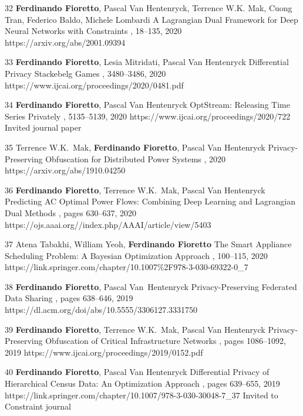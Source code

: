 \documentclass[localFont,alternative]{documentMETADATA}
\begin{document}
\begin{pubs}
	\confentryShort
	{32} %
	{{\bf Ferdinando Fioretto}, Pascal Van Hentenryck, Terrence W.K. Mak, {Cuong Tran}, Federico Baldo, Michele Lombardi} 
	{A Lagrangian Dual Framework for Deep Neural Networks with Constraints}
	{\procECML, 18--135, 2020}
	{https://arxiv.org/abs/2001.09394}

	\confentryShort
		{33} %
		{{\bf Ferdinando Fioretto}, Lesia Mitridati, Pascal Van Hentenryck}
		{Differential Privacy Stackebelg Games}
		{\procIJCAI, 3480--3486, 2020}
		{https://www.ijcai.org/proceedings/2020/0481.pdf}

	\confentryShortAwd
		{34} %
		{{\bf Ferdinando Fioretto}, Pascal Van Hentenryck}
		{OptStream: Releasing Time Series Privately}
		{\procIJCAI, 5135--5139, 2020}
	  {https://www.ijcai.org/proceedings/2020/722}
	  {Invited journal paper}
	
	\confentryShort
		{35} %
		{Terrence W.K.~Mak, {\bf Ferdinando Fioretto}, Pascal Van Hentenryck}
		{Privacy-Preserving Obfuscation for Distributed Power Systems}
		{\procPSCC, 2020}
		{https://arxiv.org/abs/1910.04250}

	\confentryShort
		{36} %
		{{\bf Ferdinando Fioretto}, Terrence W.K.~Mak, Pascal Van Hentenryck}
		{Predicting AC Optimal Power Flows: Combining Deep Learning and Lagrangian Dual Methods}
	  	{\procAAAI, pages 630--637, 2020}
	  	{https://ojs.aaai.org//index.php/AAAI/article/view/5403}

	\confentryShort
		{37} %
	    {Atena Tabakhi, William Yeoh, {\bf Ferdinando Fioretto}}
	    {The Smart Appliance Scheduling Problem: A Bayesian Optimization Approach}
	    {\procPRIMA, 100--115, 2020}
	    {https://link.springer.com/chapter/10.1007\%2F978-3-030-69322-0\_7}


	\confentryShort
		{38} %
		{{\bf Ferdinando Fioretto}, Pascal Van~Hentenryck}
		{Privacy-Preserving Federated Data Sharing}
	  	{\procAAMAS, pages 638--646, 2019}
	  	{https://dl.acm.org/doi/abs/10.5555/3306127.3331750}

	\confentryShort
		{39} %
		{{\bf Ferdinando Fioretto}, Terrence W.K.~Mak, Pascal Van Hentenryck}
		{Privacy-Preserving Obfuscation of Critical Infrastructure Networks}
	  	{\procIJCAI, pages 1086--1092, 2019}
	  	{https://www.ijcai.org/proceedings/2019/0152.pdf}

	\confentryShortAwd
		{40} %
		{{\bf Ferdinando Fioretto}, Pascal Van Hentenryck}
		{Differential Privacy of Hierarchical Census Data: An Optimization Approach} 
		{\procCP, pages 639--655, 2019}
		{https://link.springer.com/chapter/10.1007/978-3-030-30048-7\_37}
		{Invited to Constraint journal}
\end{pubs}
\end{document}
